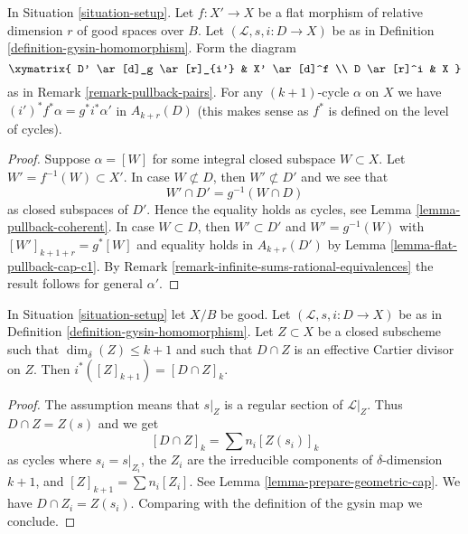 \begin{lemma}
\label{lemma-gysin-flat-pullback}
In Situation \ref{situation-setup}. Let $f : X' \to X$
be a flat morphism of relative dimension $r$ of
good spaces over $B$. Let $(\mathcal{L}, s, i : D \to X)$ be as in
Definition \ref{definition-gysin-homomorphism}. Form the diagram
$$
\xymatrix{
D' \ar[d]_g \ar[r]_{i'} & X' \ar[d]^f \\
D \ar[r]^i & X
}
$$
as in Remark \ref{remark-pullback-pairs}.
For any $(k + 1)$-cycle $\alpha$ on $X$ we have
$(i')^*f^*\alpha = g^*i^*\alpha'$ in $A_{k + r}(D)$
(this makes sense as $f^*$ is defined on the level of cycles).
\end{lemma}

\begin{proof}
Suppose $\alpha = [W]$ for some integral closed subspace
$W \subset X$. Let $W' = f^{-1}(W) \subset X'$. In case $W \not \subset D$,
then $W' \not \subset D'$ and we see that
$$
W' \cap D' = g^{-1}(W \cap D)
$$
as closed subspaces of $D'$. Hence the
equality holds as cycles, see Lemma \ref{lemma-pullback-coherent}.
In case $W \subset D$, then $W' \subset D'$ and $W' = g^{-1}(W)$
with $[W']_{k + 1 + r} = g^*[W]$ and equality holds in
$A_{k + r}(D')$ by Lemma \ref{lemma-flat-pullback-cap-c1}.
By Remark \ref{remark-infinite-sums-rational-equivalences}
the result follows for general $\alpha'$.
\end{proof}

\begin{lemma}
\label{lemma-easy-gysin}
In Situation \ref{situation-setup} let $X/B$ be good.
Let $(\mathcal{L}, s, i : D \to X)$ be as in
Definition \ref{definition-gysin-homomorphism}.
Let $Z \subset X$ be a closed subscheme such
that $\dim_\delta(Z) \leq k + 1$ and such that
$D \cap Z$ is an effective Cartier divisor on $Z$. Then
$i^*([Z]_{k + 1}) = [D \cap Z]_k$.
\end{lemma}

\begin{proof}
The assumption means that $s|_Z$ is a regular section of $\mathcal{L}|_Z$.
Thus $D \cap Z = Z(s)$ and we get
$$
[D \cap Z]_k = \sum n_i [Z(s_i)]_k
$$
as cycles where $s_i = s|_{Z_i}$, the $Z_i$ are the irreducible components
of $\delta$-dimension $k + 1$, and $[Z]_{k + 1} = \sum n_i[Z_i]$.
See Lemma \ref{lemma-prepare-geometric-cap}.
We have $D \cap Z_i = Z(s_i)$. Comparing with the definition
of the gysin map we conclude.
\end{proof}













